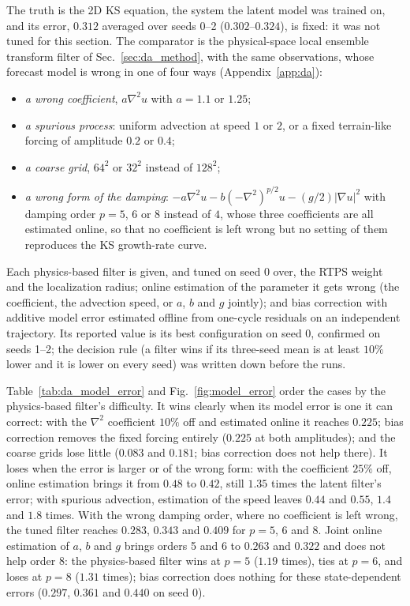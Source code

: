  The truth is the 2D KS equation, the system the latent
model was trained on, and its error, $0.312$ averaged over seeds 0--2
($0.302$--$0.324$), is fixed: it was not tuned for this section. The
comparator is the physical-space local ensemble transform filter of
Sec.~\ref{sec:da_method}, with the same observations, whose forecast
model is wrong in one of four ways (Appendix~\ref{app:da}):
\begin{itemize}
\item \emph{a wrong coefficient}, $a\nabla^2u$ with $a=1.1$ or $1.25$;
\item \emph{a spurious process}: uniform advection at speed $1$ or $2$, or a
  fixed terrain-like forcing of amplitude $0.2$ or $0.4$;
\item \emph{a coarse grid}, $64^2$ or $32^2$ instead of $128^2$;
\item \emph{a wrong form of the damping}: $-a\nabla^2u - b(-\nabla^2)^{p/2}u -
  (g/2)|\nabla u|^2$ with damping order $p=5$, $6$ or $8$ instead of $4$, whose three
  coefficients are all estimated online, so that no coefficient is left
  wrong but no setting of them reproduces the KS growth-rate curve.
\end{itemize}
Each physics-based filter is given, and tuned on seed 0 over, the RTPS
weight and the localization radius; online estimation of the parameter
it gets wrong (the coefficient, the advection speed, or $a$, $b$ and $g$
jointly); and bias correction with additive model error estimated
offline from one-cycle residuals on an independent trajectory. Its
reported value is its best configuration on seed 0, confirmed on seeds
1--2; the decision rule (a filter wins if its three-seed mean is at least
$10\%$ lower and it is lower on every seed) was written down before the
runs.

 Table~\ref{tab:da_model_error} and Fig.~\ref{fig:model_error} order the cases by the
physics-based filter's difficulty. It wins clearly when its model error
is one it can correct: with the $\nabla^2$ coefficient $10\%$ off and estimated
online it reaches $0.225$; bias correction removes the fixed forcing
entirely ($0.225$ at both amplitudes); and the coarse grids lose little
($0.083$ and $0.181$; bias correction does not help there). It loses when the error is larger or of the wrong form:
with the coefficient $25\%$ off, online estimation brings it from $0.48$ to
$0.42$, still $1.35$ times the latent filter's error; with spurious
advection, estimation of the speed leaves $0.44$ and $0.55$, $1.4$ and $1.8$
times. With the wrong damping order, where no coefficient is left wrong, the tuned
filter reaches $0.283$, $0.343$ and $0.409$ for $p = 5$, $6$ and $8$. Joint online
estimation of $a$, $b$ and $g$ brings orders 5 and 6 to $0.263$ and $0.322$ and
does not help order 8: the physics-based filter wins at $p=5$ ($1.19$ times),
ties at $p=6$, and loses at $p=8$ ($1.31$ times); bias
correction does nothing for these state-dependent errors ($0.297$, $0.361$
and $0.440$ on seed 0).

